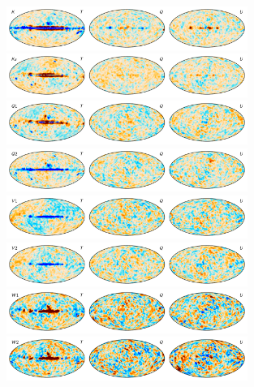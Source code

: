 \documentclass[twocolumn]{../../common/aa}
\begin{document}
\begin{figure}
	\centering
	\includegraphics[width=0.7\textwidth]{figures/tod_res_K_IQU.pdf}\\
	\includegraphics[width=0.7\textwidth]{figures/tod_res_Ka_IQU.pdf}\\
	\includegraphics[width=0.7\textwidth]{figures/tod_res_Q1_IQU.pdf}\\
	\includegraphics[width=0.7\textwidth]{figures/tod_res_Q2_IQU.pdf}\\
	\includegraphics[width=0.7\textwidth]{figures/tod_res_V1_IQU.pdf}\\
	\includegraphics[width=0.7\textwidth]{figures/tod_res_V2_IQU.pdf}\\
	\includegraphics[width=0.7\textwidth]{figures/tod_res_W1_IQU.pdf}\\
	\includegraphics[width=0.7\textwidth]{figures/tod_res_W2_IQU.pdf}\\

\end{figure}
\end{document}
